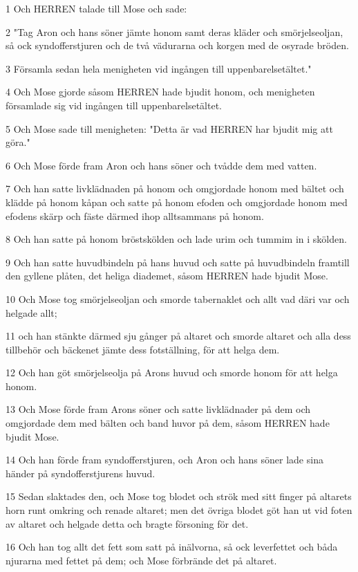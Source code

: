 \par 1 Och HERREN talade till Mose och sade:
\par 2 "Tag Aron och hans söner jämte honom samt deras kläder och smörjelseoljan, så ock syndofferstjuren och de två vädurarna och korgen med de osyrade bröden.
\par 3 Församla sedan hela menigheten vid ingången till uppenbarelsetältet."
\par 4 Och Mose gjorde såsom HERREN hade bjudit honom, och menigheten församlade sig vid ingången till uppenbarelsetältet.
\par 5 Och Mose sade till menigheten: "Detta är vad HERREN har bjudit mig att göra."
\par 6 Och Mose förde fram Aron och hans söner och tvådde dem med vatten.
\par 7 Och han satte livklädnaden på honom och omgjordade honom med bältet och klädde på honom kåpan och satte på honom efoden och omgjordade honom med efodens skärp och fäste därmed ihop alltsammans på honom.
\par 8 Och han satte på honom bröstskölden och lade urim och tummim in i skölden.
\par 9 Och han satte huvudbindeln på hans huvud och satte på huvudbindeln framtill den gyllene plåten, det heliga diademet, såsom HERREN hade bjudit Mose.
\par 10 Och Mose tog smörjelseoljan och smorde tabernaklet och allt vad däri var och helgade allt;
\par 11 och han stänkte därmed sju gånger på altaret och smorde altaret och alla dess tillbehör och bäckenet jämte dess fotställning, för att helga dem.
\par 12 Och han göt smörjelseolja på Arons huvud och smorde honom för att helga honom.
\par 13 Och Mose förde fram Arons söner och satte livklädnader på dem och omgjordade dem med bälten och band huvor på dem, såsom HERREN hade bjudit Mose.
\par 14 Och han förde fram syndofferstjuren, och Aron och hans söner lade sina händer på syndofferstjurens huvud.
\par 15 Sedan slaktades den, och Mose tog blodet och strök med sitt finger på altarets horn runt omkring och renade altaret; men det övriga blodet göt han ut vid foten av altaret och helgade detta och bragte försoning för det.
\par 16 Och han tog allt det fett som satt på inälvorna, så ock leverfettet och båda njurarna med fettet på dem; och Mose förbrände det på altaret.
